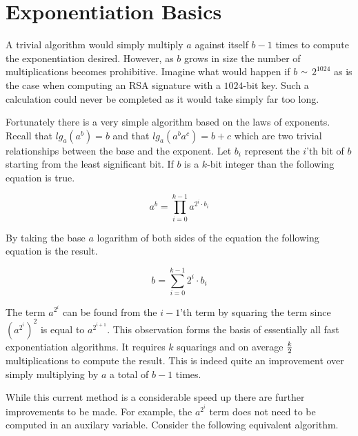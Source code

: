 \documentclass[b5paper]{book}
\def\approx{\raisebox{0.2ex}{\mbox{\small $\sim$}}}
\begin{document}
\section{Exponentiation Basics}
A trivial algorithm would simply multiply $a$ against itself $b - 1$ times to compute the exponentiation desired.  However, as $b$ grows in size
the number of multiplications becomes prohibitive.  Imagine what would happen if $b$ $\approx$ $2^{1024}$ as is the case when computing an RSA signature
with a $1024$-bit key.  Such a calculation could never be completed as it would take simply far too long.

Fortunately there is a very simple algorithm based on the laws of exponents.  Recall that $lg_a(a^b) = b$ and that $lg_a(a^ba^c) = b + c$ which
are two trivial relationships between the base and the exponent.  Let $b_i$ represent the $i$'th bit of $b$ starting from the least 
significant bit.  If $b$ is a $k$-bit integer than the following equation is true.

\begin{equation}
a^b = \prod_{i=0}^{k-1} a^{2^i \cdot b_i}
\end{equation}

By taking the base $a$ logarithm of both sides of the equation the following equation is the result.

\begin{equation}
b = \sum_{i=0}^{k-1}2^i \cdot b_i
\end{equation}

The term $a^{2^i}$ can be found from the $i - 1$'th term by squaring the term since $\left ( a^{2^i} \right )^2$ is equal to
$a^{2^{i+1}}$.  This observation forms the basis of essentially all fast exponentiation algorithms.  It requires $k$ squarings and on average
$k \over 2$ multiplications to compute the result.  This is indeed quite an improvement over simply multiplying by $a$ a total of $b-1$ times.

While this current method is a considerable speed up there are further improvements to be made.  For example, the $a^{2^i}$ term does not need to 
be computed in an auxilary variable.  Consider the following equivalent algorithm.
\end{document}
